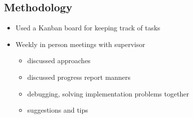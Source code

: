 \subsection*{Methodology}


\begin{itemize}
    \item Used a Kanban board for keeping track of tasks
    \item Weekly in person meetings with supervisor
    \begin{itemize}
        \item discussed approaches
        \item discussed progress report manners
        \item debugging, solving implementation problems together
        \item suggestions and tips
    \end{itemize}
    
\end{itemize}

